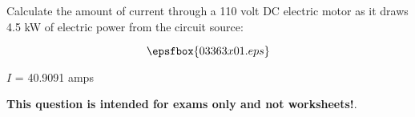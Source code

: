 

Calculate the amount of current through a 110 volt DC electric motor as it draws 4.5 kW of electric power from the circuit source:

$$\epsfbox{03363x01.eps}$$







$I$ = 40.9091 amps







{\bf This question is intended for exams only and not worksheets!}.



